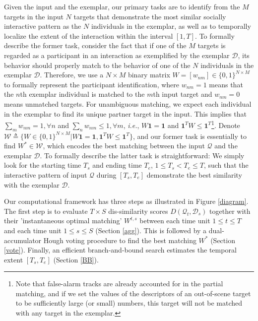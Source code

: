 \documentclass[10pt,twocolumn,letterpaper]{article}
\begin{document}
Given the input and the exemplar, our primary tasks are to identify from the $M$ targets in the input $N$ targets that demonstrate the most similar socially interactive pattern as the $N$ individuals in the exemplar, as well as to temporally localize the extent of the interaction within the interval $[1, T]$. To formally describe the former task, consider the fact that if one of the $M$ targets is regarded as a participant in an interaction as exemplified by the exemplar $\mathcal{D}$, its behavior should properly match to the behavior of one of the $N$ individuals in the exemplar $\mathcal{D}$. Therefore, we use a $N\times M$ binary matrix $W=[w_{nm}]\in\{0,1\}^{N\times M}$ to formally represent the participant identification, where $w_{nm}=1$ means that the $n$th exemplar individual is matched to the $m$th input target and $w_{nm}=0$ means unmatched targets. For unambiguous matching, we expect each individual in the exemplar to find its unique partner target in the input. This implies that $\sum_{m}w_{nm}=1, \forall n$ and $\sum_{n}w_{nm}\leq 1, \forall m$, \textit{i.e.}, $W\mathbf{1}=\mathbf{1}$ and $\mathbf{1}^{T}W\leq\mathbf{1}^{T}$\footnote{Note that false-alarm tracks are already accounted for in the partial matching, and if we set the values of the descriptors of an out-of-scene target to be sufficiently large (or small) numbers, this target will not be matched with any target in the exemplar.}. Denote $\mathcal{W}\triangleq\{W\in\{0,1\}^{N\times M}| W\mathbf{1}=\mathbf{1}, \mathbf{1}^{T}W\leq\mathbf{1}^{T}\}$, and our former task is essentially to find $W^{*}\in\mathcal{W}$, which encodes the best matching between the input $\mathcal{Q}$ and the exemplar $\mathcal{D}$. To formally describe the latter task is straightforward: We simply look for the starting time $T_{s}$ and ending time $T_{e}$, $1\le T_{s}<T_{e}\le T$, such that the interactive pattern of input $\mathcal{Q}$ during $[T_{s}, T_{e}]$ demonstrate the best similarity with the exemplar $\mathcal{D}$.

Our computational framework has three steps as illustrated in Figure \ref{diagram}. The first step is to evaluate $T\times S$ dis-similarity scores $D(\mathcal{Q}_{t}, \mathcal{D}_{s})$ together with their 'instantaneous optimal matching' $W^{t,s}$ between each time unit  $1\le t\le T$ and each time unit  $1\le s\le S$ (Section \ref{agg}). This is followed by a dual-accumulator Hough voting procedure to find the best matching $W^{*}$ (Section \ref{vote}). Finally, an efficient branch-and-bound search estimates the temporal extent $[T_{s}, T_{e}]$ (Section \ref{BB}).  
\end{document}
